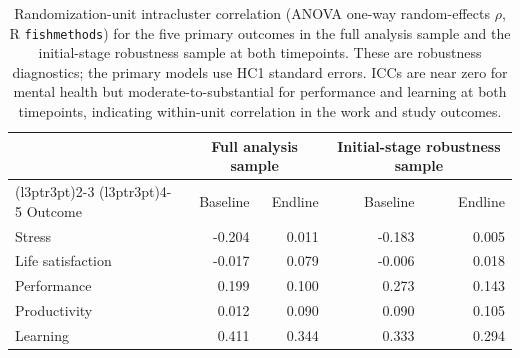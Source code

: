 \begin{table}

\caption{\label{tab:ICC}Randomization-unit intracluster correlation (ANOVA one-way random-effects $\rho$, R \texttt{fishmethods}) for the five primary outcomes in the full analysis sample and the initial-stage robustness sample at both timepoints. These are robustness diagnostics; the primary models use HC1 standard errors. ICCs are near zero for mental health but moderate-to-substantial for performance and learning at both timepoints, indicating within-unit correlation in the work and study outcomes.}
\centering
\begin{tabular}[t]{lrrrr}
\toprule
\multicolumn{1}{c}{ } & \multicolumn{2}{c}{Full analysis sample} & \multicolumn{2}{c}{Initial-stage robustness sample} \\
\cmidrule(l{3pt}r{3pt}){2-3} \cmidrule(l{3pt}r{3pt}){4-5}
Outcome & Baseline & Endline & Baseline & Endline\\
\midrule
Stress & -0.204 & 0.011 & -0.183 & 0.005\\
Life satisfaction & -0.017 & 0.079 & -0.006 & 0.018\\
Performance & 0.199 & 0.100 & 0.273 & 0.143\\
Productivity & 0.012 & 0.090 & 0.090 & 0.105\\
Learning & 0.411 & 0.344 & 0.333 & 0.294\\
\bottomrule
\end{tabular}
\end{table}
